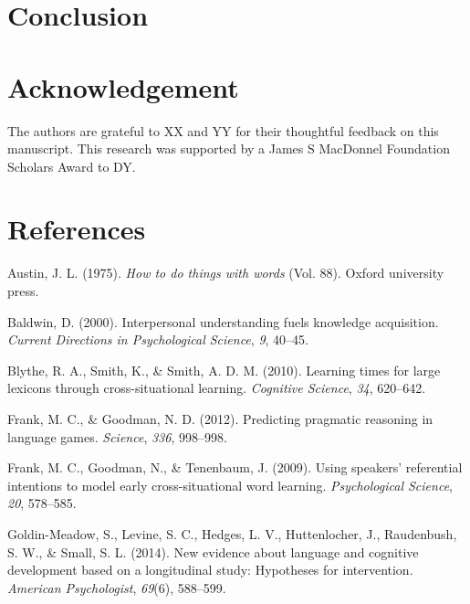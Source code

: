 \documentclass[english,,man,floatsintext]{apa6}
\begin{document}
\hypertarget{conclusion}{%
\section{Conclusion}\label{conclusion}}

\hypertarget{acknowledgement}{%
\section{Acknowledgement}\label{acknowledgement}}

The authors are grateful to XX and YY for their thoughtful feedback on this manuscript. This research was supported by a James S MacDonnel Foundation Scholars Award to DY.

\newpage

\hypertarget{references}{%
\section{References}\label{references}}

\setlength{\parindent}{-0.5in}
\setlength{\leftskip}{0.5in}

\hypertarget{refs}{}
\leavevmode\hypertarget{ref-austin1975}{}%
Austin, J. L. (1975). \emph{How to do things with words} (Vol. 88). Oxford university press.

\leavevmode\hypertarget{ref-baldwin2000}{}%
Baldwin, D. (2000). Interpersonal understanding fuels knowledge acquisition. \emph{Current Directions in Psychological Science}, \emph{9}, 40--45.

\leavevmode\hypertarget{ref-blythe2010}{}%
Blythe, R. A., Smith, K., \& Smith, A. D. M. (2010). Learning times for large lexicons through cross-situational learning. \emph{Cognitive Science}, \emph{34}, 620--642.

\leavevmode\hypertarget{ref-frank2012}{}%
Frank, M. C., \& Goodman, N. D. (2012). Predicting pragmatic reasoning in language games. \emph{Science}, \emph{336}, 998--998.

\leavevmode\hypertarget{ref-frank2009}{}%
Frank, M. C., Goodman, N., \& Tenenbaum, J. (2009). Using speakers' referential intentions to model early cross-situational word learning. \emph{Psychological Science}, \emph{20}, 578--585.

\leavevmode\hypertarget{ref-goldin-meadow2014}{}%
Goldin-Meadow, S., Levine, S. C., Hedges, L. V., Huttenlocher, J., Raudenbush, S. W., \& Small, S. L. (2014). New evidence about language and cognitive development based on a longitudinal study: Hypotheses for intervention. \emph{American Psychologist}, \emph{69}(6), 588--599.
\end{document}
